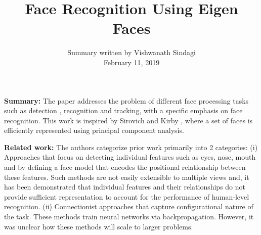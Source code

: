 \documentclass[10pt,twocolumn,letterpaper]{article}
\begin{document}
\title{Face Recognition Using Eigen Faces}

\author{Summary written by Vishwanath Sindagi\\ February 11, 2019}


\maketitle


\noindent\textbf{Summary: } The paper addresses  the problem of different face processing tasks such as  detection , recognition and tracking, with a specific emphasis on face recognition. This work is  inspired by  Sirovich and Kirby \cite{sirovich1987low}, where a set of faces is efficiently represented using principal component analysis. 

\noindent\textbf{Related work:} The authors categorize prior work primarily into 2 categories: (i) Approaches \cite{bledsoe1964model,kanade1974picture,yuille1992feature} that focus on detecting individual features such as eyes, nose, mouth \etc and by defining a face model that encodes the positional relationship between these features. Such methods are not easily extensible to multiple views and, it has been demonstrated that individual features and their relationships do not provide sufficient representation to account for the performance of human-level recognition. (ii)  Connectionist approaches \cite{fleming1990categorization,hinton2014storage,stonham1986practical} that capture configurational  nature of the task. These methods  train neural networks via backpropagation. However, it was unclear how these methods will scale to larger problems. 
\end{document}
